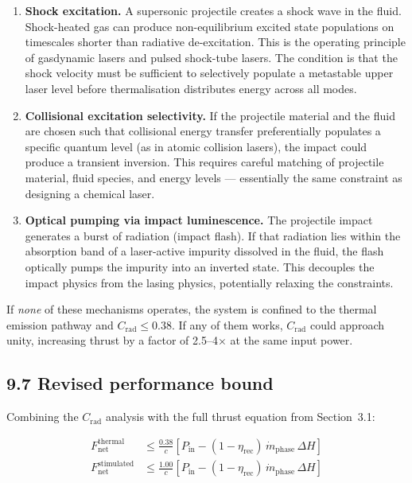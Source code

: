 \documentclass[12pt]{article}
\begin{document}
\begin{enumerate}
  \item \textbf{Shock excitation.} A supersonic projectile creates a shock wave
        in the fluid. Shock-heated gas can produce non-equilibrium excited
        state populations on timescales shorter than radiative de-excitation.
        This is the operating principle of gasdynamic lasers and pulsed
        shock-tube lasers. The condition is that the shock velocity must be
        sufficient to selectively populate a metastable upper laser level
        before thermalisation distributes energy across all modes.

  \item \textbf{Collisional excitation selectivity.} If the projectile material
        and the fluid are chosen such that collisional energy transfer preferentially
        populates a specific quantum level (as in atomic collision lasers), the
        impact could produce a transient inversion. This requires careful
        matching of projectile material, fluid species, and energy levels —
        essentially the same constraint as designing a chemical laser.

  \item \textbf{Optical pumping via impact luminescence.} The projectile impact
        generates a burst of radiation (impact flash). If that radiation lies
        within the absorption band of a laser-active impurity dissolved in the
        fluid, the flash optically pumps the impurity into an inverted state.
        This decouples the impact physics from the lasing physics, potentially
        relaxing the constraints.
\end{enumerate}

If \emph{none} of these mechanisms operates, the system is confined to the
thermal emission pathway and $C_{\mathrm{rad}} \leq 0.38$. If any of them
works, $C_{\mathrm{rad}}$ could approach unity, increasing thrust by a factor
of 2.5--4$\times$ at the same input power.

\subsection*{9.7 Revised performance bound}

Combining the $C_{\mathrm{rad}}$ analysis with the full thrust equation from
Section~3.1:

\begin{align}
  F_{\mathrm{net}}^{\mathrm{thermal}} &\leq
    \frac{0.38}{c}\!\left[P_{\mathrm{in}}
    - (1-\eta_{\mathrm{rec}})\,\dot{m}_{\mathrm{phase}}\,\Delta H\right] \\[6pt]
  F_{\mathrm{net}}^{\mathrm{stimulated}} &\leq
    \frac{1.00}{c}\!\left[P_{\mathrm{in}}
    - (1-\eta_{\mathrm{rec}})\,\dot{m}_{\mathrm{phase}}\,\Delta H\right]
\end{align}
\end{document}
